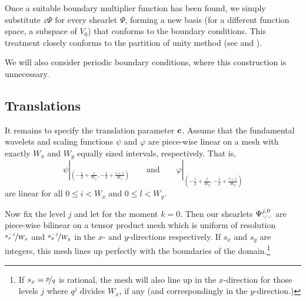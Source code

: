 Once a suitable boundary multiplier function has been found, we simply substitute $z\Psi$ for every shearlet
$\Psi$, forming a new basis (for a different function space, a subspace of $V_0$) that conforms to the
boundary conditions. This treatment closely conforms to the partition of unity method (see \cite{Melenk1996puf} and
\cite{Babuska1997pum}).

We will also consider periodic boundary conditions, where this construction is unnecessary.

\subsection{Translations} \label{sec:translations}

It remains to specify the translation parameter ${\bm c}$. Assume that the fundamental wavelets and scaling
functions $\psi$ and $\varphi$ are piece-wise linear on a mesh with exactly $W_x$ and $W_y$ equally sized
intervals, respectively. That is,
\[
    \psi|_{\left(-\frac{1}{2}+\frac{i}{W_x},-\frac{1}{2}+\frac{i+1}{W_x}\right)}
    \qquad \text{and} \qquad
    \varphi|_{\left(-\frac{1}{2}+\frac{l}{W_y},-\frac{1}{2}+\frac{l+1}{W_y}\right)}
\]
are linear for all $0 \leq i < W_x$ and $0 \leq l < W_y$.

Now fix the level $j$ and let for the moment $k=0$. Then our shearlets $\Psi_{\cdot,\cdot,\cdot}^{j,0}$ are
piece-wise bilinear on a tensor product mesh which is uniform of resolution $\nicefrac{s_x^{-j}}{W_x}$ and
$\nicefrac{s_y^{-j}}{W_y}$ in the $x$- and $y$-directions respectively. If $s_x$ and $s_y$ are integers, this
mesh lines up perfectly with the boundaries of the domain.\footnote{If $s_x=\nicefrac{p}{q}$ is rational, the
mesh will also line up in the $x$-direction for those levels $j$ where $q^j$ divides $W_x$, if any (and
correspondingly in the $y$-direction.)}

